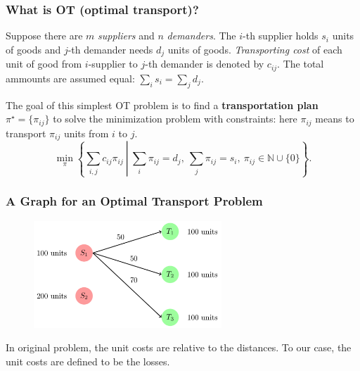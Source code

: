 \documentclass[slidetop, mathserif, dvipsnames]{beamer}
\begin{document}
\begin{frame}
    \frametitle{What is OT (optimal transport)?}

    Suppose there are $m$ {\it suppliers} and $n$ {\it demanders}.
    The $i$-th supplier holds $s_i$ units of goods and $j$-th demander
    needs $d_j$ units of goods.
    {\it Transporting cost} of each unit of good from $i$-supplier
    to $j$-th demander is denoted by $c_{ij}$.
    The total ammounts are assumed equal: $\sum_{i}s_i = \sum_j d_j$.

    \quad
    
    The goal of this simplest OT problem is to find a {\bf transportation plan}
    $\pi^\star = \{\pi_{ij}\}$ to solve the minimization problem with constraints:
    here $\pi_{ij}$ means to transport $\pi_{ij}$ units from $i$ to $j$.
    \[
        \min_\pi\left\{\sum_{i,j} c_{ij}\pi_{ij}\ \left|\ \sum_i \pi_{ij} = d_j,~ \sum_j \pi_{ij}=s_i,
        ~ \pi_{ij}\in\mathbb N\cup\{0\}\right.\right\}.
    \]
    
\end{frame}

\begin{frame}
    \frametitle{A Graph for an Optimal Transport Problem}

    \begin{figure}
    \includegraphics[width=200pt]{pics/ota_graph.png}
    \end{figure}

    In original problem, the unit costs are relative to the distances.
    To our case, the unit costs are defined to be the losses.

\end{frame}
\end{document}
